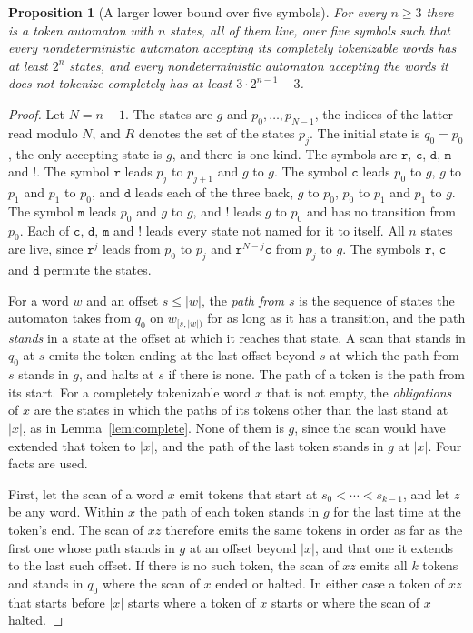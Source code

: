 \documentclass[11pt,a4paper]{article}
\theoremstyle{definition}
\theoremstyle{plain}
\newtheorem{proposition}{Proposition}
\newcommand{\code}[1]{\texttt{#1}}
\begin{document}
\begin{proposition}[A larger lower bound over five symbols]
\label{prop:five}
For every $n \geq 3$ there is a token automaton with $n$ states, all of them live, over five symbols such that every
nondeterministic automaton accepting its completely tokenizable words has at least $2^n$ states, and every
nondeterministic automaton accepting the words it does not tokenize completely has at least $3 \cdot 2^{n-1} - 3$.
\end{proposition}

\begin{proof}
Let $N = n - 1$. The states are $g$ and $p_0, \ldots, p_{N-1}$, the indices of the latter read modulo $N$, and $R$
denotes the set of the states $p_j$. The initial state is $q_0 = p_0$, the only accepting state is $g$, and there is one
kind. The symbols are $\code{r}$, $\code{c}$, $\code{d}$, $\code{m}$ and $\code{!}$. The symbol $\code{r}$ leads $p_j$
to $p_{j+1}$ and $g$ to $g$. The symbol $\code{c}$ leads $p_0$ to $g$, $g$ to $p_1$ and $p_1$ to $p_0$, and $\code{d}$
leads each of the three back, $g$ to $p_0$, $p_0$ to $p_1$ and $p_1$ to $g$. The symbol $\code{m}$ leads $p_0$ and $g$
to $g$, and $\code{!}$ leads $g$ to $p_0$ and has no transition from $p_0$. Each of $\code{c}$, $\code{d}$, $\code{m}$
and $\code{!}$ leads every state not named for it to itself. All $n$ states are live, since $\code{r}^j$ leads from
$p_0$ to $p_j$ and $\code{r}^{N-j}\code{c}$ from $p_j$ to $g$. The symbols $\code{r}$, $\code{c}$ and $\code{d}$ permute
the states.

For a word $w$ and an offset $s \leq |w|$, the \emph{path from $s$} is the sequence of states the automaton takes from
$q_0$ on $w_{[s, |w|)}$ for as long as it has a transition, and the path \emph{stands} in a state at the offset at which
it reaches that state. A scan that stands in $q_0$ at $s$ emits the token ending at the last offset beyond $s$ at which
the path from $s$ stands in $g$, and halts at $s$ if there is none. The path of a token is the path from its start. For
a completely tokenizable word $x$ that is not empty, the \emph{obligations} of $x$ are the states in which the paths of
its tokens other than the last stand at $|x|$, as in Lemma~\ref{lem:complete}. None of them is $g$, since the scan would
have extended that token to $|x|$, and the path of the last token stands in $g$ at $|x|$. Four facts are used.

First, let the scan of a word $x$ emit tokens that start at $s_0 < \cdots < s_{k-1}$, and let $z$ be any word. Within
$x$ the path of each token stands in $g$ for the last time at the token's end. The scan of $xz$ therefore emits the same
tokens in order as far as the first one whose path stands in $g$ at an offset beyond $|x|$, and that one it extends to
the last such offset. If there is no such token, the scan of $xz$ emits all $k$ tokens and stands in $q_0$ where the
scan of $x$ ended or halted. In either case a token of $xz$ that starts before $|x|$ starts where a token of $x$ starts
or where the scan of $x$ halted.


\end{proof}
\end{document}
